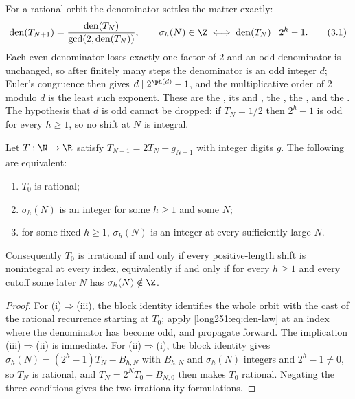 For a rational orbit the denominator settles the matter exactly:
\begin{equation}
 \operatorname{den}(T_{N+1})
 =\frac{\operatorname{den}(T_N)}{\gcd(2,\operatorname{den}(T_N))},
 \qquad
 \sigma_h(N)\in\Z
 \iff
 \operatorname{den}(T_N)\mid 2^h-1 .
\tag{3.1}\label{long251:eq:den-law}
\end{equation}
Each even denominator loses exactly one factor of $2$ and an odd denominator is
unchanged, so after finitely many steps the denominator is an odd integer $d$;
Euler's congruence then gives $d\mid2^{\ph(d)}-1$, and the multiplicative order
of $2$ modulo $d$ is the least such exponent.  These are the
, its
 and
, the
, the
, and the
.  The hypothesis that $d$ is odd
cannot be dropped: if $T_N=1/2$ then $2^{h}-1$ is odd for every $h\ge1$, so no
shift at $N$ is integral.

\begin{theorem}\label{long251:res:escape-irrational}
Let $T:\N\to\R$ satisfy $T_{N+1}=2T_N-g_{N+1}$ with integer digits $g$.  The
following are equivalent:
\begin{enumerate}[label=\textup{(\roman*)}]
\item $T_0$ is rational;
\item $\sigma_h(N)$ is an integer for some $h\ge1$ and some $N$;
\item for some fixed $h\ge1$, $\sigma_h(N)$ is an integer at every
  sufficiently large $N$.
\end{enumerate}
Consequently $T_0$ is irrational if and only if every positive-length shift is
nonintegral at every index, equivalently if and only if for every $h\ge1$ and
every cutoff some later $N$ has $\sigma_h(N)\notin\Z$.
\end{theorem}

\begin{proof}
For \textup{(i)}$\Rightarrow$\textup{(iii)}, the block identity identifies the
whole orbit with the cast of the rational recurrence starting at $T_0$; apply
\eqref{long251:eq:den-law} at an index where the denominator has become odd, and
propagate forward.  The implication
\textup{(iii)}$\Rightarrow$\textup{(ii)} is immediate.  For
\textup{(ii)}$\Rightarrow$\textup{(i)}, the block identity gives
$\sigma_h(N)=(2^h-1)T_N-B_{h,N}$ with $B_{h,N}$ and $\sigma_h(N)$ integers and
$2^h-1\ne0$, so $T_N$ is rational, and $T_N=2^NT_0-B_{N,0}$ then makes $T_0$
rational.  Negating the three conditions gives the two irrationality
formulations.
\end{proof}


